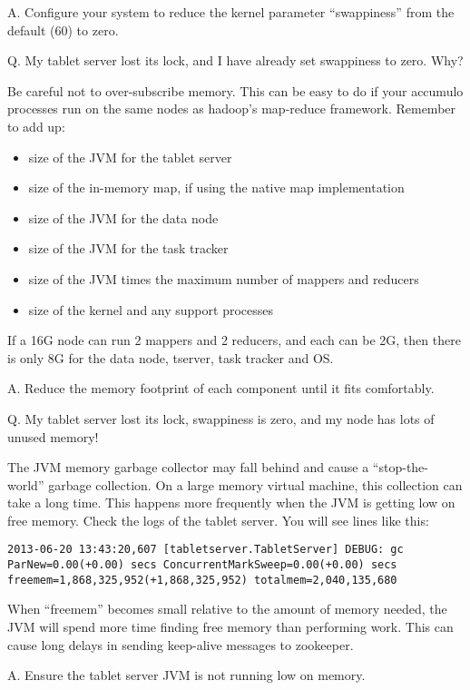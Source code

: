 A. Configure your system to reduce the kernel parameter ``swappiness'' from the default (60) to zero.

Q. My tablet server lost its lock, and I have already set swappiness to
zero.  Why?

Be careful not to over-subscribe memory.  This can be easy to do if
your accumulo processes run on the same nodes as hadoop's map-reduce
framework.  Remember to add up:

\begin{itemize}
\item{size of the JVM for the tablet server}
\item{size of the in-memory map, if using the native map implementation}
\item{size of the JVM for the data node}
\item{size of the JVM for the task tracker}
\item{size of the JVM times the maximum number of mappers and reducers}
\item{size of the kernel and any support processes}
\end{itemize}

If a 16G node can run 2 mappers and 2 reducers, and each can be 2G,
then there is only 8G for the data node, tserver, task tracker and OS.

A. Reduce the memory footprint of each component until it fits comfortably.

Q. My tablet server lost its lock, swappiness is zero, and my node has lots of unused memory!

The JVM memory garbage collector may fall behind and cause a
``stop-the-world'' garbage collection. On a large memory virtual
machine, this collection can take a long time.  This happens more
frequently when the JVM is getting low on free memory.  Check the logs
of the tablet server.  You will see lines like this:

\small
\begin{verbatim}
2013-06-20 13:43:20,607 [tabletserver.TabletServer] DEBUG: gc ParNew=0.00(+0.00) secs ConcurrentMarkSweep=0.00(+0.00) secs freemem=1,868,325,952(+1,868,325,952) totalmem=2,040,135,680
\end{verbatim}
\normalsize

When ``freemem'' becomes small relative to the amount of memory
needed, the JVM will spend more time finding free memory than
performing work.  This can cause long delays in sending keep-alive
messages to zookeeper.

A. Ensure the tablet server JVM is not running low on memory.

